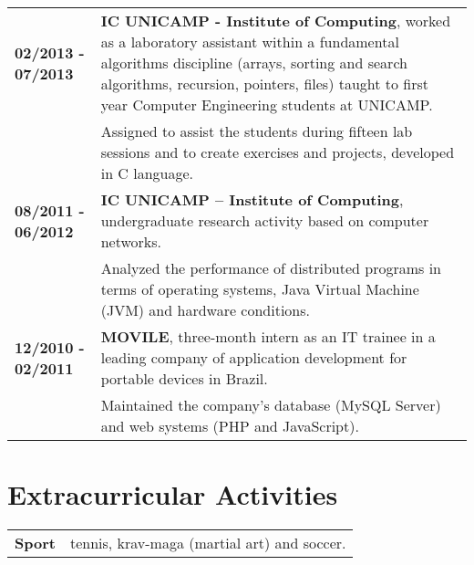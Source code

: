\documentclass[10pt, a4paper]{article}
\begin{document}
\begin{tabular}{p{} p{}}

 \textbf{02/2013 - 07/2013}   & \textbf{IC UNICAMP - Institute of
 Computing}, worked as a laboratory assistant within a fundamental algorithms
 discipline (arrays, sorting and search algorithms, recursion, pointers, files)
 taught to first year Computer Engineering students at UNICAMP. \\
 & Assigned to assist the students during fifteen lab sessions and to create
exercises and projects, developed in C language.\\

 \textbf{08/2011 - 06/2012} & \textbf{IC UNICAMP – Institute of
 Computing}, undergraduate research activity based on computer networks.  \\
 & Analyzed the performance of distributed programs in terms of operating
 systems, Java Virtual Machine (JVM) and hardware conditions. \\
 
 
 \textbf{12/2010 - 02/2011} & \textbf{MOVILE}, three-month intern as an
 IT trainee in a leading company of application development for portable devices in Brazil.\\
 & Maintained the company’s database (MySQL Server) and web systems (PHP and
 JavaScript).  \\
 
\end{tabular}


\section{Extracurricular Activities}

\begin{tabular}{p{} p{}}

\textbf{Sport} & tennis, krav-maga (martial art) and soccer. \\ 

\end{tabular}

\end{document}
